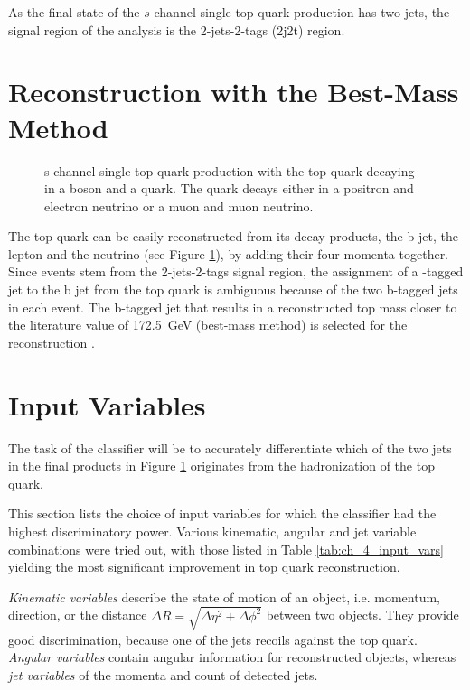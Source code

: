 As the final state of the $s$-channel single top quark production has two jets, the signal region of the analysis is the 2-jets-2-tags (2j2t) region.

\section{Reconstruction with the Best-Mass Method}
\label{sec:ch-5-best-mass}
\begin{figure}[h]
    \centering
    
    \caption{s-channel single top quark production with the top quark decaying in a \PWplus boson and a \Pbottom quark. The \PWplus quark decays either in a positron and electron neutrino or a muon and muon neutrino.}
    \label{fig:ch_4_single_top_reco}
\end{figure}
The top quark can be easily reconstructed from its decay products, the b jet, the lepton and the neutrino (see Figure \ref{fig:ch_4_single_top_reco}), by adding their four-momenta together. Since events stem from the 2-jets-2-tags signal region, the assignment of a \Pbottom-tagged jet to the b jet from the top quark is ambiguous because of the two b-tagged jets in each event. The b-tagged jet that results in a reconstructed top mass closer to the literature value of \SI{172.5}{GeV} (best-mass method) is selected for the reconstruction \cite{Fal18}.

\section{Input Variables}
\label{sec:ch-5-input-vars}
The task of the classifier will be to accurately differentiate which of the two \Pbottom jets in the final products in Figure \ref{fig:ch_4_single_top_reco} originates from the hadronization of the top quark.

This section lists the choice of input variables for which the classifier had the highest discriminatory power. Various kinematic, angular and jet variable combinations were tried out, with those listed in Table \ref{tab:ch_4_input_vars} yielding the most significant improvement in top quark reconstruction.

\emph{Kinematic variables} describe the state of motion of an object, i.e. momentum, direction, or the distance $\Delta R=\sqrt{\Delta \eta^2 + \Delta \phi^2}$ between two objects. They provide good discrimination, because one of the jets recoils against the top quark. \emph{Angular variables} contain angular information for reconstructed objects, whereas \emph{jet variables} of the momenta and count of detected jets.

